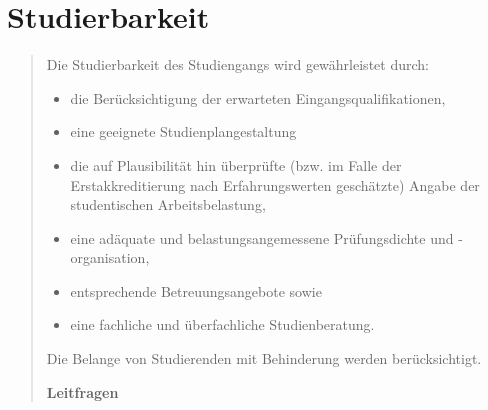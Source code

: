 \chapter{Studierbarkeit}\label{studierbarkeit}

\begin{quote}
Die Studierbarkeit des Studiengangs wird gewährleistet durch:

\begin{itemize}
\tightlist
\item
  die Berücksichtigung der erwarteten Eingangsqualifikationen,
\item
  eine geeignete Studienplangestaltung
\item
  die auf Plausibilität hin überprüfte (bzw. im Falle der
  Erstakkreditierung nach Erfahrungswerten geschätzte) Angabe der
  studentischen Arbeitsbelastung,
\item
  eine adäquate und belastungsangemessene Prüfungsdichte und
  -organisation,
\item
  entsprechende Betreuungsangebote sowie
\item
  eine fachliche und überfachliche Studienberatung.
\end{itemize}

Die Belange von Studierenden mit Behinderung werden berücksichtigt.

\textbf{Leitfragen}


\end{quote}

